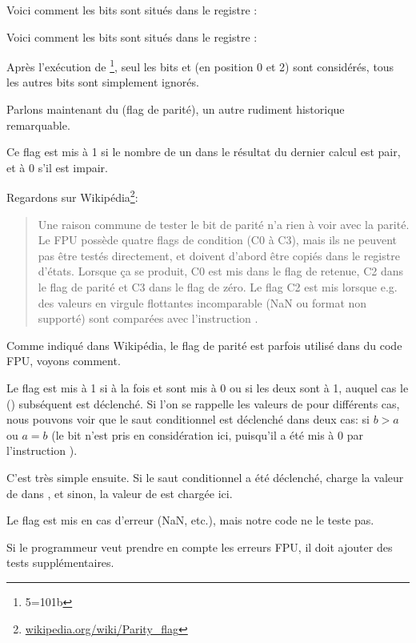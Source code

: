 Voici comment les bits \CThreeBits sont situés dans le registre \AX:



Voici comment les bits \CThreeBits sont situés dans le registre \AH:



Après l'exécution de \footnote{5=101b}, seul les bits \Czero et \Ctwo
(en position 0 et 2) sont considérés, tous les autres bits sont simplement ignorés.

\label{parity_flag}

Parlons maintenant du  (flag de parité), un autre rudiment historique
remarquable.

Ce flag est mis à 1 si le nombre de un dans le résultat du dernier calcul est pair,
et à 0 s'il est impair.

Regardons sur Wikipédia\footnote{\href{http://go.yurichev.com/17131}{wikipedia.org/wiki/Parity\_flag}}:

\begin{framed}
\begin{quotation}
Une raison commune de tester le bit de parité n'a rien à voir avec la parité. Le FPU
possède quatre flags de condition (C0 à C3), mais ils ne peuvent pas être testés
directement, et doivent d'abord être copiés dans le registre d'états.
Lorsque ça se produit, C0 est mis dans le flag de retenue, C2 dans le flag
de parité et C3 dans le flag de zéro.
Le flag C2 est mis lorsque e.g. des valeurs en virgule flottantes incomparable
(NaN ou format non supporté) sont comparées avec l'instruction \FUCOM.
\end{quotation}
\end{framed}

Comme indiqué dans Wikipédia, le flag de parité est parfois utilisé dans du code
FPU, voyons comment.


Le flag \PF est mis à 1 si à la fois \Czero et \Ctwo sont mis à 0 ou si les deux
sont à 1, auquel cas le \JP () subséquent est déclenché.
Si l'on se rappelle les valeurs de \CThreeBits pour différents cas, nous pouvons
voir que le saut conditionnel \JP est déclenché dans deux cas: si $b>a$ ou $a=b$
(le bit \Cthree n'est pris en considération ici, puisqu'il a été mis à 0 par l'instruction
).

C'est très simple ensuite.
Si le saut conditionnel a été déclenché, \FLD charge la valeur de  dans
, et sinon, la valeur de  est chargée ici.


Le flag \Ctwo est mis en cas d'erreur (\gls{NaN}, etc.), mais notre code ne le teste
pas.

Si le programmeur veut prendre en compte les erreurs FPU, il doit ajouter des tests
supplémentaires.


